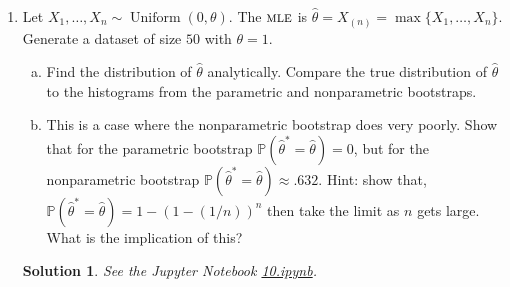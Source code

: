 \documentclass[10pt]{article}
\newtheorem*{sol}{Solution}
\renewcommand{\P}{\mathbb{P}}
\newcommand{\Unif}{\operatorname{Uniform}}
\newcommand{\MLE}{\textsc{mle}}
\begin{document}
\begin{enumerate}
\item[(10)] Let $X_1,\ldots, X_n \sim \Unif(0,\theta)$. The $\MLE$ is
$\hat\theta = X_{(n)}=\max\{X_1,\ldots,X_n\}$.
Generate a dataset of size $50$ with $\theta=1$.
\begin{enumerate}[(a)]
\item Find the distribution of $\hat \theta$ analytically.
Compare the true distribution
of $\hat \theta$ to the histograms from the parametric and nonparametric
bootstraps.
\item This is a case where the nonparametric bootstrap does very poorly.
Show that for the parametric bootstrap $\P(\hat \theta^*=\hat \theta)=0$,
but for the
nonparametric bootstrap $\P(\hat \theta^*=\hat\theta)\approx .632$.
Hint: show that, $\P(\hat \theta^*=\hat \theta)=1 - (1-(1/n))^n$
then take the limit as $n$ gets large. What is the implication of this?
\end{enumerate}

\begin{sol}
See the Jupyter Notebook
\href{https://github.com/ajrasmus/some_of_statistics/blob/main/chapter_9/10.ipynb}{10.ipynb}.
\end{sol}
\end{enumerate}
\end{document}
